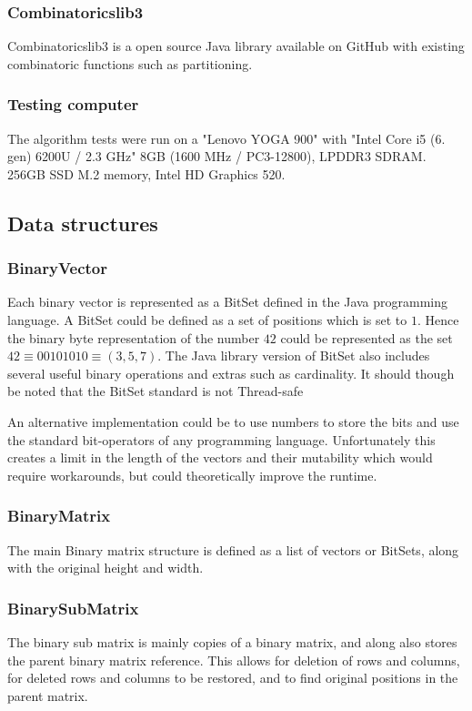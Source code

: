 \documentclass[a4paper]{article}
\begin{document}
\subsubsection{Combinatoricslib3}
Combinatoricslib3 is a open source Java library available on GitHub with existing
combinatoric functions such as partitioning.

\subsubsection{Testing computer}
The algorithm tests were run on a "Lenovo YOGA 900" with "Intel Core i5 (6. gen) 6200U / 2.3 GHz"
8GB (1600 MHz / PC3-12800), LPDDR3 SDRAM. 256GB SSD M.2 memory, Intel HD Graphics 520.

\subsection{Data structures}
\subsubsection{BinaryVector}
Each binary vector is represented as a BitSet defined in the Java programming language. A
BitSet could be defined as a set of positions which is set to $1$. Hence the binary byte
representation of the number $42$ could be represented as the set
$42 \equiv 00101010 \equiv (3,5,7)$. The Java library version of BitSet also includes several
useful binary operations and extras such as cardinality. It should though be noted that the
BitSet standard is not Thread-safe \cite{bitset_java_14_2020}


An alternative implementation could be to use numbers to store the bits and use the standard
bit-operators of any programming language. Unfortunately this creates a limit in the length
of the vectors and their mutability which would require workarounds, but could theoretically
improve the runtime.

\subsubsection{BinaryMatrix}
The main Binary matrix structure is defined as a list of vectors or BitSets, along with the
original height and width.

\subsubsection{BinarySubMatrix}
The binary sub matrix is mainly copies of a binary matrix, and along also stores the parent
binary matrix reference. This allows for deletion of rows and columns, for deleted rows and
columns to be restored, and to find original positions in the parent matrix.
\end{document}
